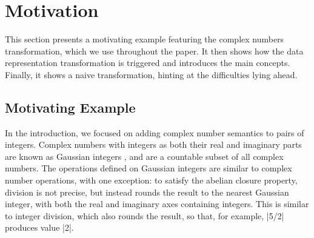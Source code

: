 \section{Motivation}
\label{sec:problem}

This section presents a motivating example featuring the complex numbers transformation, which we use throughout the paper. It then shows how the data representation transformation is triggered and introduces the main concepts. Finally, it shows a naive transformation, hinting at the difficulties lying ahead.

\subsection{Motivating Example}

In the introduction, we focused on adding complex number semantics to
pairs of integers. Complex numbers with integers as both their real
and imaginary parts are known as Gaussian integers
\cite{gauss1828theoria,gaussian-integers-wikipedia}, and are a
countable subset of all complex numbers. The operations defined on
Gaussian integers are similar to complex number operations, with one
exception: to satisfy the abelian closure property, division is not precise,
but instead rounds the result to the nearest Gaussian integer, with both the real and imaginary
axes containing integers. This is similar to integer division, which
also rounds the result, so that, for example, |5/2| produces value
|2|.


